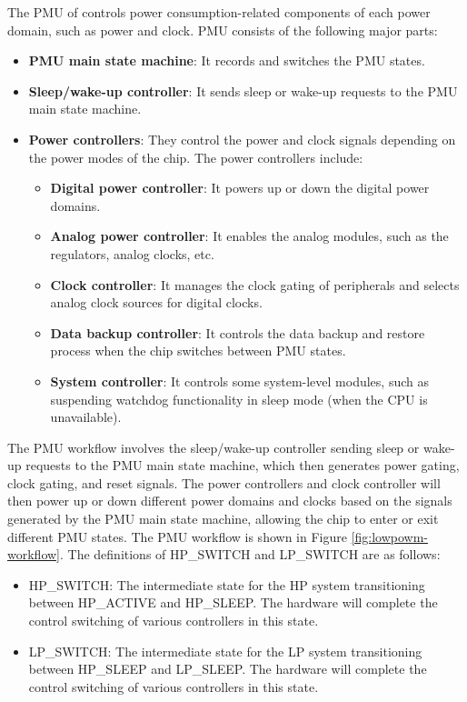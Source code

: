 \documentclass[main\_\_EN.tex]{subfiles}
\begin{document}
The PMU of \chipname{} controls power consumption-related components of each power domain, such as power and clock. PMU consists of the following major parts:

\begin{itemize}
    \item \textbf{PMU main state machine}: It records and switches the PMU states.
    \item \textbf{Sleep/wake-up controller}: It sends sleep or wake-up requests to the PMU main state machine.
    \item \textbf{Power controllers}: They control the power and clock signals depending on the power modes of the chip. The power controllers include:
        \begin{itemize}
            \item \textbf{Digital power controller}: It powers up or down the digital power domains.
            \item \textbf{Analog power controller}: It enables the analog modules, such as the regulators, analog clocks, etc.
            \item \textbf{Clock controller}: It manages the clock gating of peripherals and selects analog clock sources for digital clocks.
            \item \textbf{Data backup controller}: It controls the data backup and restore process when the chip switches between PMU states.

            \item \textbf{System controller}: It controls some system-level modules, such as suspending watchdog functionality in sleep mode (when the CPU is unavailable).
        \end{itemize}
\end{itemize}

The PMU workflow involves the sleep/wake-up controller sending sleep or wake-up requests to the PMU main state machine, which then generates power gating, clock gating, and reset signals. The power controllers and clock controller will then power up or down different power domains and clocks based on the signals generated by the PMU main state machine, allowing the chip to enter or exit different PMU states. The PMU workflow is shown in Figure \ref{fig:lowpowm-workflow}. The definitions of HP\_SWITCH and LP\_SWITCH are as follows:

\begin{itemize}
    \item HP\_SWITCH: The intermediate state for the HP system transitioning between HP\_ACTIVE and HP\_SLEEP. The hardware will complete the control switching of various controllers in this state.
    \item LP\_SWITCH: The intermediate state for the LP system transitioning between HP\_SLEEP and LP\_SLEEP. The hardware will complete the control switching of various controllers in this state.
\end{itemize}
\end{document}
